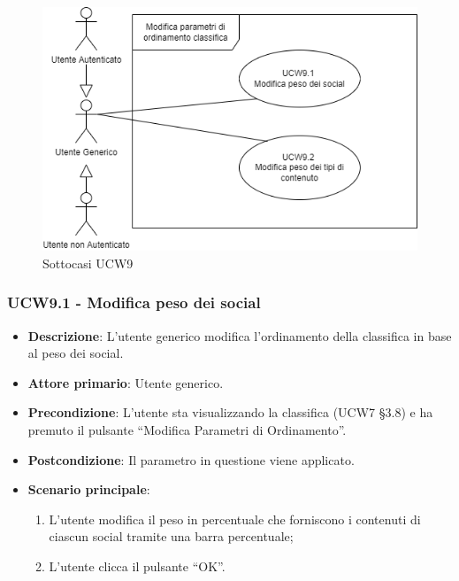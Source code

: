 \begin{figure}[!h]
\centering
    \includegraphics[scale=0.5]{UC_images/UCW9-.png}
    \caption{Sottocasi UCW9}
\end{figure}

\subsubsection{UCW9.1 - Modifica peso dei social }
\begin{itemize}
	\item \textbf{Descrizione}: L'utente generico modifica l'ordinamento della classifica in base al peso dei social.
    \item \textbf{Attore primario}: Utente generico.
    \item \textbf{Precondizione}: L’utente sta visualizzando la classifica (UCW7 §3.8) e ha premuto il pulsante “Modifica Parametri di Ordinamento”.
    \item \textbf{Postcondizione}: Il parametro in questione viene applicato.
    \item \textbf{Scenario principale}: 
    \begin{enumerate}
        \item L’utente modifica il peso in percentuale che forniscono i contenuti di ciascun social tramite una barra percentuale;
        \item L’utente clicca il pulsante “OK”.
    \end{enumerate}
\end{itemize}

